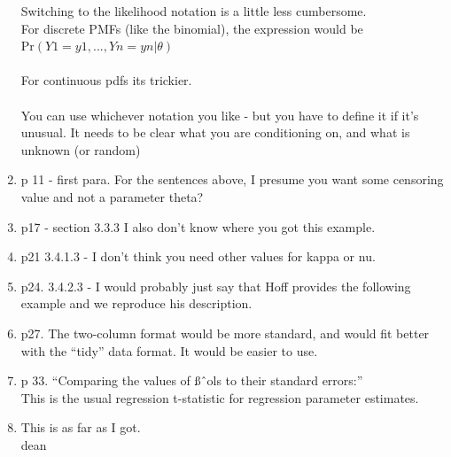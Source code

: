 \documentclass[12pt, a4paper]{article}
\begin{document}
\begin{enumerate}
    Switching to the likelihood notation is a little less cumbersome.  \\
    For discrete PMFs (like the binomial), the expression would be\\
    Pr$(Y1 = y1,...,Yn=yn | \theta)$\\\\

    For continuous pdfs its trickier.\\\\

    You can use whichever notation you like - but you have to define it if it’s unusual.  It needs to be clear what you are conditioning on, and what is unknown (or random)
  \item p 11 - first para.  For the sentences above, I presume you want some censoring value and not a parameter theta?
  \item p17 - section 3.3.3  I also don't know where you got this example.
  \item p21 3.4.1.3 - I don't think you need other values for kappa or nu.
  \item p24. 3.4.2.3 - I would probably just say that Hoff provides the following example and we reproduce his description.
  \item p27. The two-column format would be more standard, and would fit better with the “tidy” data format.  It would be easier to use.
  \item p 33.  ``Comparing the values of ßˆols to their standard errors:”\\
    This is the usual regression t-statistic for regression parameter estimates.
  \item This is as far as I got.\\
    dean

\end{enumerate}
\end{document}
